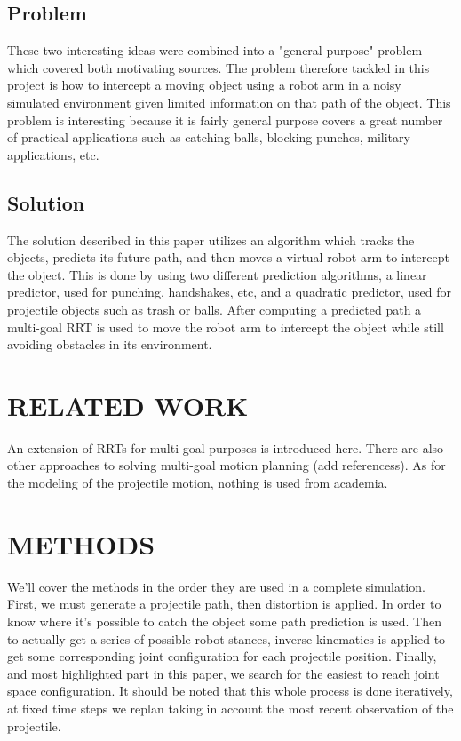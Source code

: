 \documentclass[letterpaper, 10 pt, conference]{ieeeconf}  %
\begin{document}
\subsection{Problem}

These two interesting ideas were combined into a "general purpose" problem
which covered both motivating sources. The problem therefore tackled in this
project is how to intercept a moving object using a robot arm in a noisy
simulated environment given limited information on that path of the object.
This problem is interesting because it is fairly general purpose covers a great
number of practical applications such as catching balls, blocking punches,
military applications, etc.

\subsection{Solution}

The solution described in this paper utilizes an algorithm which tracks the
objects, predicts its future path, and then moves a virtual robot arm to
intercept the object. This is done by using two different prediction
algorithms, a linear predictor, used for punching, handshakes, etc, and a
quadratic predictor, used for projectile objects such as trash or balls. After
computing a predicted path a multi-goal RRT is used to move the robot arm to
intercept the object while still avoiding obstacles in its environment.



\section{RELATED WORK}

An extension of RRTs for multi goal purposes is introduced here. There are also
other approaches to solving multi-goal motion planning (add referencess). As
for the modeling of the projectile motion, nothing is used from academia.

\section{METHODS}

We'll cover the methods in the order they are used in a complete simulation.
First, we must generate a projectile path, then distortion is applied. In order
to know where it's possible to catch the object some path prediction is used.
Then to actually get a series of possible robot stances, inverse kinematics is
applied to get some corresponding joint configuration for each projectile
position. Finally, and most highlighted part in this paper, we search for the
easiest to reach joint space configuration. It should be noted that this whole
process is done iteratively, at fixed time steps we replan taking in account
the most recent observation of the projectile.
\end{document}
